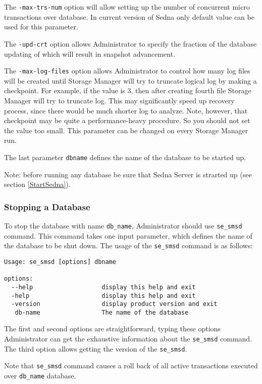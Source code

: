 \documentclass[a4paper,12pt]{article}
\begin{document}
The \verb!-max-trs-num! option will allow setting up the number of concurrent micro transactions over database. In current version of Sedna only default value can be used for this parameter.

The \verb!-upd-crt! option allows Administrator to specify the fraction of the database updating of which will result in snapshot advancement.

The \verb!-max-log-files! option allows Administrator to control how many log files will be created until Storage Manager will try
to truncate logical log by making a checkpoint. For example, if the value is $3$, then after creating fourth file Storage Manager will try to truncate log. This may significantly speed up recovery process, since there would be much shorter log to analyze. Note, however, that checkpoint may be quite a performance-heavy procedure. So you should not set the value too small. This parameter can be changed on every Storage Manager run.

The last parameter \verb!dbname!  defines the name of the database to be started up.


Note: before running any database be sure that Sedna Server is strarted up (see section \ref{StartSedna}).

\subsubsection{Stopping a Database}
\label{StopDB}

To stop the database with name \verb!db_name!, Administrator should use \verb!se_smsd! command. This command takes one input parameter, which defines the name of the database to be shut down. The usage of the \verb!se_smsd! command is as follows:

\begin{verbatim}
Usage: se_smsd [options] dbname

options:
  --help                   display this help and exit
  -help                    display this help and exit
  -version                 display product version and exit
   db-name                 The name of the database
\end{verbatim}

The first and second options are straightforward, typing these options Administrator can get the exhaustive information about the \verb!se_smsd! command.
The third option allows getting the version of the \verb!se_smsd!.

Note that \verb!se_smsd! command causes a roll back of all active transactions executed over \verb!db_name! database.
\end{document}
